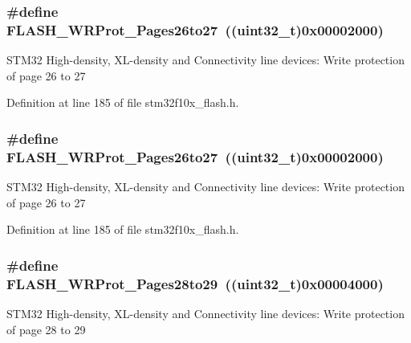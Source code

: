 \subsubsection[{\texorpdfstring{F\+L\+A\+S\+H\+\_\+\+W\+R\+Prot\+\_\+\+Pages26to27}{FLASH_WRProt_Pages26to27}}]{\setlength{\rightskip}{0pt plus 5cm}\#define F\+L\+A\+S\+H\+\_\+\+W\+R\+Prot\+\_\+\+Pages26to27~(({\bf uint32\+\_\+t})0x00002000)}\hypertarget{group___option___bytes___write___protection_ga92c8a9f8b6875fccb072df795eff5e7e}{}\label{group___option___bytes___write___protection_ga92c8a9f8b6875fccb072df795eff5e7e}
S\+T\+M32 High-\/density, X\+L-\/density and Connectivity line devices\+: Write protection of page 26 to 27 

Definition at line 185 of file stm32f10x\+\_\+flash.\+h.

\subsubsection[{\texorpdfstring{F\+L\+A\+S\+H\+\_\+\+W\+R\+Prot\+\_\+\+Pages26to27}{FLASH_WRProt_Pages26to27}}]{\setlength{\rightskip}{0pt plus 5cm}\#define F\+L\+A\+S\+H\+\_\+\+W\+R\+Prot\+\_\+\+Pages26to27~(({\bf uint32\+\_\+t})0x00002000)}\hypertarget{group___option___bytes___write___protection_ga92c8a9f8b6875fccb072df795eff5e7e}{}\label{group___option___bytes___write___protection_ga92c8a9f8b6875fccb072df795eff5e7e}
S\+T\+M32 High-\/density, X\+L-\/density and Connectivity line devices\+: Write protection of page 26 to 27 

Definition at line 185 of file stm32f10x\+\_\+flash.\+h.

\subsubsection[{\texorpdfstring{F\+L\+A\+S\+H\+\_\+\+W\+R\+Prot\+\_\+\+Pages28to29}{FLASH_WRProt_Pages28to29}}]{\setlength{\rightskip}{0pt plus 5cm}\#define F\+L\+A\+S\+H\+\_\+\+W\+R\+Prot\+\_\+\+Pages28to29~(({\bf uint32\+\_\+t})0x00004000)}\hypertarget{group___option___bytes___write___protection_gae42c20bedcbaf926c7c49f51a7eea63f}{}\label{group___option___bytes___write___protection_gae42c20bedcbaf926c7c49f51a7eea63f}
S\+T\+M32 High-\/density, X\+L-\/density and Connectivity line devices\+: Write protection of page 28 to 29 

